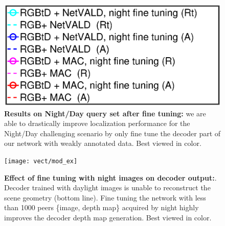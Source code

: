 \begin{figure}
	\includegraphics[trim={100 58 165 300},clip,width=0.4\linewidth]{plot/fig/legend_night}
	\caption{\label{fig:ft_night} \textbf{Results on Night/Day query set after fine tuning:} we are able to drastically improve localization performance for the Night/Day challenging scenario by only fine tune the decoder part of our network with weakly annotated data. Best viewed in color.}
\end{figure}

\begin{figure}
	\center
	\texttt{[image: vect/mod\_ex]}	
	\caption{\label{fig:mod_ex} \textbf{Effect of fine tuning with night images on decoder output:}. Decoder trained with daylight images is unable to reconstruct the scene geometry (bottom line). Fine tuning the network with less than 1000 peers \{image, depth map\} acquired by night highly improves the decoder depth map generation. Best viewed in color.}
\end{figure}
